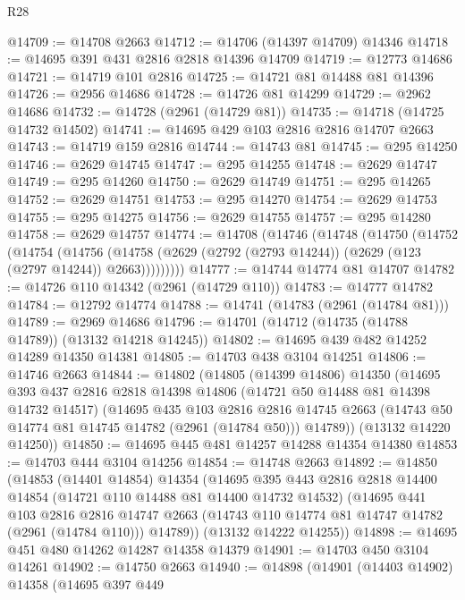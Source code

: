 \begin{lexlean}{R28}
\begin{coremodule}
@14709 := @14708 @2663
@14712 := @14706 (@14397 @14709) @14346
@14718 := @14695 @391 @431 @2816 @2818 @14396 @14709
@14719 := @12773 @14686
@14721 := @14719 @101 @2816
@14725 := @14721 @81 @14488 @81 @14396
@14726 := @2956 @14686
@14728 := @14726 @81 @14299
@14729 := @2962 @14686
@14732 := @14728 (@2961 (@14729 @81))
@14735 := @14718 (@14725 @14732 @14502)
@14741 := @14695 @429 @103 @2816 @2816 @14707 @2663
@14743 := @14719 @159 @2816
@14744 := @14743 @81
@14745 := @295 @14250
@14746 := @2629 @14745
@14747 := @295 @14255
@14748 := @2629 @14747
@14749 := @295 @14260
@14750 := @2629 @14749
@14751 := @295 @14265
@14752 := @2629 @14751
@14753 := @295 @14270
@14754 := @2629 @14753
@14755 := @295 @14275
@14756 := @2629 @14755
@14757 := @295 @14280
@14758 := @2629 @14757
@14774 := @14708
    (@14746
      (@14748
        (@14750
          (@14752
            (@14754
              (@14756
                (@14758 (@2629 (@2792 (@2793 @14244)) (@2629 (@123 (@2797 @14244)) @2663)))))))))
@14777 := @14744 @14774 @81 @14707
@14782 := @14726 @110 @14342 (@2961 (@14729 @110))
@14783 := @14777 @14782
@14784 := @12792 @14774
@14788 := @14741 (@14783 (@2961 (@14784 @81)))
@14789 := @2969 @14686
@14796 := @14701 (@14712 (@14735 (@14788 @14789)) (@13132 @14218 @14245))
@14802 := @14695 @439 @482 @14252 @14289 @14350 @14381
@14805 := @14703 @438 @3104 @14251
@14806 := @14746 @2663
@14844 := @14802
    (@14805
      (@14399 @14806)
      @14350
      (@14695
        @393
        @437
        @2816
        @2818
        @14398
        @14806
        (@14721 @50 @14488 @81 @14398 @14732 @14517)
        (@14695
          @435
          @103
          @2816
          @2816
          @14745
          @2663
          (@14743 @50 @14774 @81 @14745 @14782 (@2961 (@14784 @50)))
          @14789))
      (@13132 @14220 @14250))
@14850 := @14695 @445 @481 @14257 @14288 @14354 @14380
@14853 := @14703 @444 @3104 @14256
@14854 := @14748 @2663
@14892 := @14850
    (@14853
      (@14401 @14854)
      @14354
      (@14695
        @395
        @443
        @2816
        @2818
        @14400
        @14854
        (@14721 @110 @14488 @81 @14400 @14732 @14532)
        (@14695
          @441
          @103
          @2816
          @2816
          @14747
          @2663
          (@14743 @110 @14774 @81 @14747 @14782 (@2961 (@14784 @110)))
          @14789))
      (@13132 @14222 @14255))
@14898 := @14695 @451 @480 @14262 @14287 @14358 @14379
@14901 := @14703 @450 @3104 @14261
@14902 := @14750 @2663
@14940 := @14898
    (@14901
      (@14403 @14902)
      @14358
      (@14695
        @397
        @449

\end{coremodule}
\end{lexlean}
